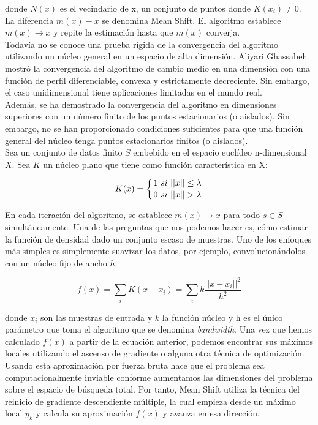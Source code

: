 \documentclass[a4paper, 20pt]{article}
\begin{document}
donde $N(x)$ es el vecindario de x, un conjunto de puntos donde $K(x_i)\neq0$.\\

La diferencia $m(x)-x$ se denomina Mean Shift. El algoritmo establece $m(x)\rightarrow x$ y repite la estimación hasta que $m(x)$ converja.\\

Todavía no se conoce una prueba rígida de la convergencia del algoritmo utilizando un núcleo general en un espacio de alta dimensión. Aliyari Ghassabeh mostró la convergencia del algoritmo de cambio medio en una dimensión con una función de perfil diferenciable, convexa y estrictamente decreciente. Sin embargo, el caso unidimensional tiene aplicaciones limitadas en el mundo real.\\

Además, se ha demostrado la convergencia del algoritmo en dimensiones superiores con un número finito de los puntos estacionarios (o aislados). Sin embargo, no se han proporcionado condiciones suficientes para que una función general del núcleo tenga puntos estacionarios finitos (o aislados).\\

Sea un conjunto de datos finito $S$ embebido en el espacio euclídeo n-dimensional $X$. Sea $K$ un núcleo plano que tiene como función característica en X:

$$K(x)=\left\{
1 \ si \ ||x||\leq \lambda \atop
0 \ si \ ||x||> \lambda
\right.$$

En cada iteración del algoritmo, se establece $m(x)\rightarrow x$ para todo $s\in S$ simultáneamente. Una de las preguntas que nos podemos hacer es, cómo estimar la función de densidad dado un conjunto escaso de muestras. Uno de los enfoques más simples es simplemente suavizar los datos, por ejemplo, convolucionándolos con un núcleo fijo de ancho $h$:

$$f(x)=\sum_i K(x-x_i)=\sum_i k\dfrac{||x-x_i||^2}{h^2}$$

donde $x_i$ son las muestras de entrada y $k$ la función núcleo y h es el único parámetro que toma el algoritmo que se denomina \textit{bandwidth}. Una vez que hemos calculado $f(x)$ a partir de la ecuación anterior, podemos encontrar sus máximos locales utilizando el ascenso de gradiente o alguna otra técnica de optimización.\\

Usando esta aproximación por fuerza bruta hace que el problema sea computacionalmente inviable conforme aumentamos las dimensiones del problema sobre el espacio de búsqueda total. Por tanto, Mean Shift utiliza la técnica del reinicio de gradiente descendiente múltiple, la cual empieza desde un máximo local $y_k$ y calcula su aproximación $f(x)$ y avanza en esa dirección.
\end{document}
